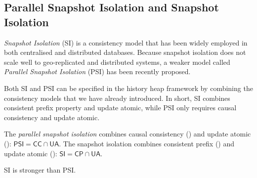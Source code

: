 
\subsection{Parallel Snapshot Isolation and Snapshot Isolation}
\emph{Snapshot Isolation} (SI) is a consistency model that has been widely employed in both centralised and distributed databases. 
Because snapshot isolation does not scale well to geo-replicated and distributed systems, a weaker model called \emph{Parallel Snapshot Isolation} (PSI) has been recently proposed. 

Both SI and PSI can be specified in the history heap framework by combining the consistency models that we have already introduced. 
In short, SI combines consistent prefix property and update atomic, while PSI only requires causal consistency and update atomic.
\begin{defn}
The \emph{parallel snapshot isolation} combines causal consistency ()  and update atomic (): $\mathsf{PSI} = \mathsf{CC} \cap \mathsf{UA}$.
The {snapshot isolation} combines consistent prefix () and update atomic (): $\mathsf{SI} = \mathsf{CP} \cap \mathsf{UA}$.
\end{defn}

\begin{lem}
SI is stronger than PSI.
\end{lem}

